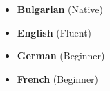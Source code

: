 \begin{itemize}[leftmargin=1.2em, itemsep=2pt]
	\item \textbf{Bulgarian} (Native)
	\item \textbf{English} (Fluent)
	\item \textbf{German} (Beginner)
	\item \textbf{French} (Beginner)
\end{itemize}
